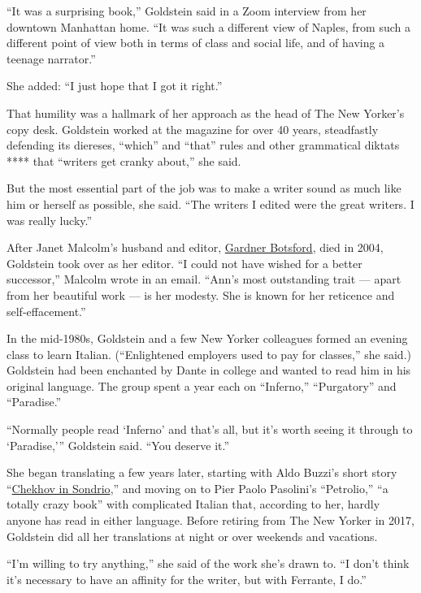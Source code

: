 ``It was a surprising book,'' Goldstein said in a Zoom interview from
her downtown Manhattan home. ``It was such a different view of Naples,
from such a different point of view both in terms of class and social
life, and of having a teenage narrator.''

She added: ``I just hope that I got it right.''

That humility was a hallmark of her approach as the head of The New
Yorker's copy desk. Goldstein worked at the magazine for over 40 years,
steadfastly defending its diereses, ``which'' and ``that'' rules and
other grammatical diktats **** that ``writers get cranky about,'' she
said.

But the most essential part of the job was to make a writer sound as
much like him or herself as possible, she said. ``The writers I edited
were the great writers. I was really lucky.''

After Janet Malcolm's husband and editor,
\href{https://www.nytimes3xbfgragh.onion/2004/09/29/nyregion/obituaries/gardner-botsford-87-dies-editor-at-the-new-yorker.html}{Gardner
Botsford}, died in 2004, Goldstein took over as her editor. ``I could
not have wished for a better successor,'' Malcolm wrote in an email.
``Ann's most outstanding trait --- apart from her beautiful work --- is
her modesty. She is known for her reticence and self-effacement.''

In the mid-1980s, Goldstein and a few New Yorker colleagues formed an
evening class to learn Italian. (``Enlightened employers used to pay for
classes,'' she said.) Goldstein had been enchanted by Dante in college
and wanted to read him in his original language. The group spent a year
each on ``Inferno,'' ``Purgatory'' and ``Paradise.''

``Normally people read `Inferno' and that's all, but it's worth seeing
it through to `Paradise,''' Goldstein said. ``You deserve it.''

She began translating a few years later, starting with Aldo Buzzi's
short story
``\href{https://archives.newyorker.com/newyorker/1992-09-14/flipbook/028/}{Chekhov
in Sondrio},'' and moving on to Pier Paolo Pasolini's ``Petrolio,'' ``a
totally crazy book'' with complicated Italian that, according to her,
hardly anyone has read in either language. Before retiring from The New
Yorker in 2017, Goldstein did all her translations at night or over
weekends and vacations.

``I'm willing to try anything,'' she said of the work she's drawn to.
``I don't think it's necessary to have an affinity for the writer, but
with Ferrante, I do.''

